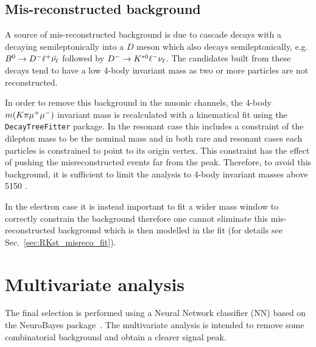 \subsection{Mis-reconstructed background}
\label{sec:RKst_peaking_Dchains}

A source of mis-reconstructed background is due to cascade decays with a \Bz decaying semileptonically
into a $D$ meson which also decays semileptonically, e.g. ${{B}^0}\rightarrow D^{-} \ell^+ \bar{\nu_\ell}$
followed by $D^{-} \rightarrow {\ensuremath{{K}^{*0}}} \ell^- \nu_\ell$. The candidates built from these decays tend to have a low
4-body invariant mass as two or more particles are not reconstructed.

In order to remove this background in the muonic channels, the 4-body $m(K\pi\mumu)$ invariant mass is recalculated
with a kinematical fit using the \verb!DecayTreeFitter! package. In the resonant case this includes a constraint of the dilepton
mass to be the \jpsi nominal mass and in both rare and resonant cases each particles is constrained to point to 
its origin vertex. This constraint has the effect of pushing the misreconstructed events far from the \Bz peak.
Therefore, to avoid this background, it is sufficient to limit the analysis to 4-body invariant masses
above 5150 \mevcc.

In the electron case it is instead important to fit a wider mass window to correctly constrain the background
therefore one cannot eliminate this mis-reconstructed background which is then modelled in the fit
(for details see Sec.~\ref{sec:RKst_misreco_fit}).


\section{Multivariate analysis}
\label{sec:RKst_mva}

The final selection is performed using a Neural Network classifier (NN) based on the NeuroBayes
package~\cite{Feindt:2006pm,feindt-2004}. The multivariate analysis is intended to remove
some combinatorial background and obtain a clearer signal peak.

